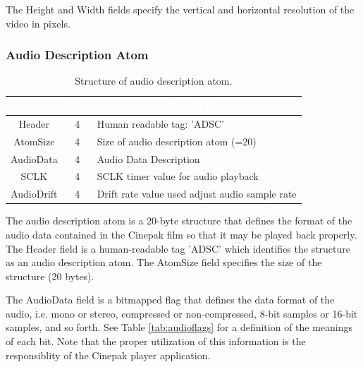 \documentclass[12pt,letterpaper,twoside]{article}
\newcommand{\tabheadtxt}[1]{\multicolumn{1}{c}{\textcolor{white}{\textbf{#1}}}}
\begin{document}
The Height and Width fields specify the vertical and horizontal resolution of the video in pixels. 

\subsubsection{Audio Description Atom}

\begin{table}[h]
\centering
\begin{tabular}{|c|c|p{8cm}|}
\hline
\rowcolor{black}
\tabheadtxt{Field} & \tabheadtxt{Size} & \tabheadtxt{Description} \\
\hline
Header & 4 & Human readable tag: 'ADSC'\\
\hline
AtomSize & 4 & Size of audio description atom (=20)\\
\hline
AudioData & 4 & Audio Data Description\\
\hline
SCLK & 4 & SCLK timer value for audio playback\\
\hline
AudioDrift & 4 & Drift rate value used adjust audio sample rate\\
\hline
\end{tabular}
\caption{Structure of audio description atom.}
\label{tab:audiodesc}
\end{table}
\FloatBarrier

The audio description atom is a 20-byte structure that defines the format of the audio data contained in the Cinepak film so that it may be played back properly. The Header field is a human-readable tag 'ADSC' which identifies the structure as an audio description atom. The AtomSize field specifies the size of the structure (20 bytes).

The AudioData field is a bitmapped flag that defines the data format of the audio, i.e. mono or stereo, compressed or non-compressed, 8-bit samples or 16-bit samples, and so forth. See Table \ref{tab:audioflags} for a definition of the meanings of each bit. Note that the proper utilization of this information is the responsiblity of the Cinepak player application. 
\end{document}
